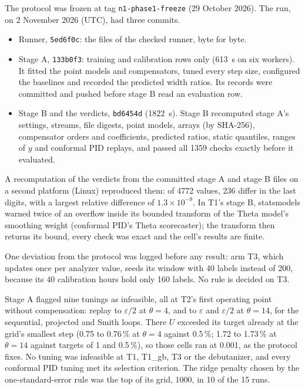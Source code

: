 \documentclass[10pt,a4paper]{article}
\begin{document}
The protocol was frozen at tag \texttt{n1-phase1-freeze} (29 October 2026). The run, on
2 November 2026 (UTC), had three commits.
\begin{itemize}\setlength{\itemsep}{0pt}
\item Runner, \texttt{5ed6f0c}: the files of the checked runner, byte for byte.
\item Stage A, \texttt{133b0f3}: training and calibration rows only (613~s on six workers). It
fitted the point models and compensators, tuned every step size, configured the baselines and
recorded the predicted width ratios. Its records were committed and pushed before stage B read an evaluation
row.
\item Stage B and the verdicts, \texttt{bd6454d} (1822~s). Stage B recomputed stage A's settings,
streams, file digests, point models, arrays (by SHA-256), compensator orders and coefficients,
predicted ratios, static quantiles, ranges of $y$ and conformal PID replays, and passed all 1359
checks exactly before it evaluated.
\end{itemize}
A recomputation of the verdicts from the committed stage A and stage B files on a second platform
(Linux) reproduced them: of 4772 values, 236 differ in the last digits, with a largest relative
difference of $1.3 \times 10^{-9}$. In T1's stage B, statsmodels warned twice of an overflow inside its bounded transform of the Theta
model's smoothing weight (conformal PID's Theta scorecaster); the transform then returns its
bound, every check was exact and the cell's results are finite.

One deviation from the protocol was logged before any result: arm T3, which updates once per
analyzer value, seeds its window with 40 labels instead of 200, because its 40 calibration hours
hold only 160 labels. No rule is decided on T3.

Stage A flagged nine tunings as infeasible, all at T2's first operating point without
compensation: replay to $\varepsilon/2$ at $\theta = 4$, and to $\varepsilon$ and $\varepsilon/2$
at $\theta = 14$, for the sequential, projected and Smith loops. There $U$ exceeded its target
already at the grid's smallest step (0.75 to 0.76\,\% at $\theta = 4$ against 0.5\,\%; 1.72 to
1.73\,\% at $\theta = 14$ against targets of 1 and 0.5\,\%), so those cells ran at 0.001, as the
protocol fixes. No tuning was infeasible at T1, T1\_gb, T3 or the debutanizer, and every conformal PID tuning met its
selection criterion. The ridge penalty chosen by the one-standard-error rule was the top of its
grid, 1000, in 10 of the 15 runs.
\end{document}
